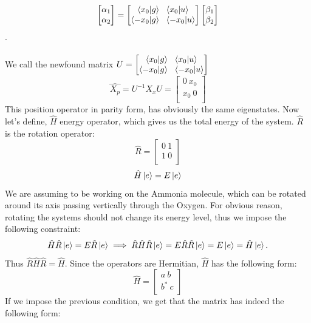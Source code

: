 \documentclass{article}
\begin{document}
$$ \begin{bmatrix}
    \alpha_1 \\
    \alpha_2 \\ 
\end{bmatrix} = \begin{bmatrix}
    \bra{x_0}\ket{g} \ \ \bra{x_0}\ket{u} \\
    \bra{-x_0}\ket{g} \  \ \bra{-x_0}\ket{u} \\
\end{bmatrix} \begin{bmatrix}
    \beta_1 \\
    \beta_2 \\
\end{bmatrix}$$. \\ \\
We call the newfound matrix $U = \begin{bmatrix}
    \bra{x_0}\ket{g} \ \ \bra{x_0}\ket{u} \\
    \bra{-x_0}\ket{g} \  \ \bra{-x_0}\ket{u} \\
\end{bmatrix} $
$$\hat{X_p} = U^{-1} X_x U = \begin{bmatrix}
    0 \ x_0 \\
    x_0 \ 0 \\
\end{bmatrix}$$ 
This position operator in parity form, has obviously the same eigenstates.
Now let's define, $\hat{H}$ energy operator, which gives us the total energy of the system.
$\hat{R}$ is the rotation operator:
$$\hat{R} = \begin{bmatrix}
    0 \ 1 \\
    1 \ 0 \\
\end{bmatrix}$$
$$\hat{H} \ket{e} = E \ket{e}$$
We are assuming to be working on the Ammonia molecule, which can be rotated around its axis passing vertically through the Oxygen. For obvious reason, rotating the systems should not change its energy level, thus we impose the following constraint:
$$ \hat{H}\hat{R}\ket{e} = E\hat{R}\ket{e}  \implies
\hat{R}\hat{H}\hat{R}\ket{e} = E\hat{R}\hat{R}\ket{e} = E\ket{e} = \hat{H}\ket{e}.$$
Thus $\hat{R}\hat{H}\hat{R} = \hat{H}$.
Since the operators are Hermitian, $\hat{H}$ has the following form:
$$\hat{H} = \begin{bmatrix}
    a \ b \\
    b^* \ c \\
\end{bmatrix}$$
If we impose the previous condition, we get that the matrix has indeed the following form:
\end{document}
